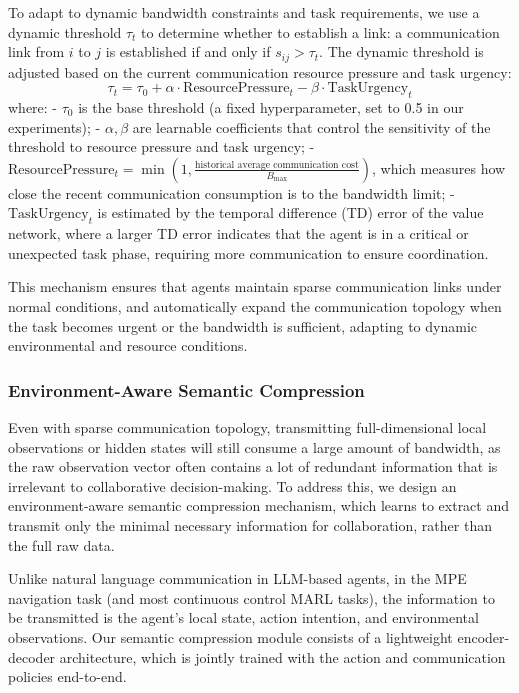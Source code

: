\documentclass[10pt, twocolumn]{IEEEtran}
\begin{document}
To adapt to dynamic bandwidth constraints and task requirements, we use a dynamic threshold $\tau_t$ to determine whether to establish a link: a communication link from $i$ to $j$ is established if and only if $s_{ij} > \tau_t$. The dynamic threshold is adjusted based on the current communication resource pressure and task urgency:
\begin{equation}
\tau_t = \tau_0 + \alpha \cdot \text{ResourcePressure}_t - \beta \cdot \text{TaskUrgency}_t
\end{equation}
where:
- $\tau_0$ is the base threshold (a fixed hyperparameter, set to 0.5 in our experiments);
- $\alpha, \beta$ are learnable coefficients that control the sensitivity of the threshold to resource pressure and task urgency;
- $\text{ResourcePressure}_t = \min(1, \frac{\text{historical average communication cost}}{B_{\max}})$, which measures how close the recent communication consumption is to the bandwidth limit;
- $\text{TaskUrgency}_t$ is estimated by the temporal difference (TD) error of the value network, where a larger TD error indicates that the agent is in a critical or unexpected task phase, requiring more communication to ensure coordination.

This mechanism ensures that agents maintain sparse communication links under normal conditions, and automatically expand the communication topology when the task becomes urgent or the bandwidth is sufficient, adapting to dynamic environmental and resource conditions.

\subsubsection{Environment-Aware Semantic Compression}
Even with sparse communication topology, transmitting full-dimensional local observations or hidden states will still consume a large amount of bandwidth, as the raw observation vector often contains a lot of redundant information that is irrelevant to collaborative decision-making. To address this, we design an environment-aware semantic compression mechanism, which learns to extract and transmit only the minimal necessary information for collaboration, rather than the full raw data.

Unlike natural language communication in LLM-based agents, in the MPE navigation task (and most continuous control MARL tasks), the information to be transmitted is the agent's local state, action intention, and environmental observations. Our semantic compression module consists of a lightweight encoder-decoder architecture, which is jointly trained with the action and communication policies end-to-end.
\end{document}
